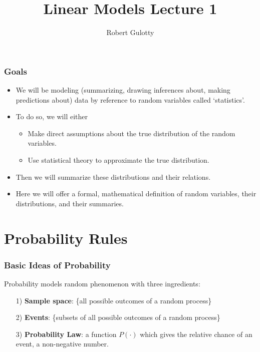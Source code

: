 \documentclass[aspectratio=169, handout]{beamer}
\title[PLSC 30700]{Linear Models Lecture 1}
\author{Robert Gulotty}
\institute[Chicago]{University of Chicago}
\numberwithin{equation}{section}
\begin{document}
\begin{frame}
\maketitle
\end{frame}



\begin{frame}
\frametitle{Goals}
\begin{itemize}
\item We will be modeling (summarizing, drawing inferences about, making predictions about) data by reference to random variables called `statistics'.
\item To do so, we will either
\begin{itemize}
\item Make direct assumptions about the true distribution of the random variables.
\item Use statistical theory to approximate the true distribution.
\end{itemize}
\item Then we will summarize these distributions and their relations.
\item Here we will offer a formal, mathematical definition of random variables, their distributions, and their summaries.
\end{itemize}
\end{frame}


\section{Probability Rules}
\begin{frame}
\frametitle{Basic Ideas of Probability}

Probability models random phenomenon with three ingredients:\pause 
\begin{itemize}
\item[1)] \textbf{Sample space}: \{all possible outcomes of a random process\} \pause 
\item[2)] \textbf{Events}: \{subsets of all possible outcomes of a random process\} \pause 
\item[3)] \textbf{Probability Law}: a function $P(\cdot)$ which gives the relative chance of an event, a non-negative number.
\end{itemize}
\end{frame}
\end{document}
